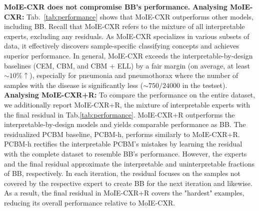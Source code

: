\noindent \textbf{MoIE-CXR does not compromise BB's performance.}
\noindent \textbf{Analysing MoIE-CXR:} Tab.~\ref{tab:performance} shows that MoIE-CXR outperforms other models, including BB. Recall that MoIE-CXR refers to the mixture of all interpretable experts, excluding any residuals. As MoIE-CXR specializes in various subsets of data, it effectively discovers sample-specific classifying concepts and achieves superior performance.
In general, MoIE-CXR exceeds the interpretable-by-design baselines (CEM, CBM, and CBM + ELL) by a fair margin (on average, at least $\sim 10\% \uparrow$), especially for pneumonia and pneumothorax where the number of samples with the disease is significantly less ($\sim 750/24000$ in the testset).
\noindent\textbf{Analysing MoIE-CXR+R:}
 To compare the performance on the entire dataset, we additionally report MoIE-CXR+R, the mixture of interpretable experts with the final residual in Tab.\ref{tab:performance}. MoIE-CXR+R outperforms the interpretable-by-design models and yields comparable performance as BB. The residualized PCBM baseline, \ie PCBM-h, performs similarly to MoIE-CXR+R.
 PCBM-h rectifies the interpretable PCBM's mistakes by learning the residual with the complete dataset to resemble BB's performance. However, the experts and the final residual approximate the interpretable and uninterpretable fractions of BB, respectively. In each iteration, the residual focuses on the samples not covered by the respective expert to create BB for the next iteration and likewise. As a result, the final residual in MoIE-CXR+R covers the "hardest" examples, reducing its overall performance relative to MoIE-CXR. 